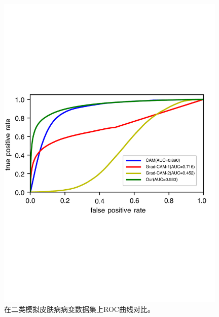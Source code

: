 \begin{figure}[H]
	\centering
	\includegraphics[width=0.98\textwidth]{figure/ROC_cam_grad_cam_our_simulated_skin_datasets}
	\caption[在二类模拟皮肤病病变数据集上ROC曲线对比]{在二类模拟皮肤病病变数据集上ROC曲线对比。}
	
	\label{fig:roc_cam_grad_cam_our_simulated_skin_datasets}
\end{figure}
